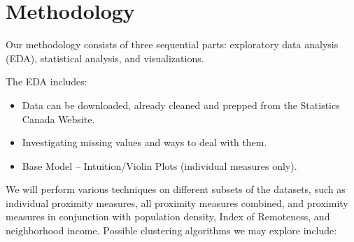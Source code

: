 \documentclass[11pt, a4paper]{article}
\newcommand{\comment}[1]{}
\begin{document}
\section*{Methodology}

\comment{
\subsection*{Data Investigation}
\subsection*{Statistical Analysis}
\subsection*{Visualization}
}

Our methodology consists of three sequential parts: exploratory data analysis (EDA), statistical analysis, and visualizations.
\par
The EDA includes:
\begin{itemize}
\item Data can be downloaded, already cleaned and prepped from the Statistics Canada Website.
\item Investigating missing values and ways to deal with them.
\item Base Model – Intuition/Violin Plots (individual measures only).
\end{itemize}

We will perform various techniques on different subsets of the datasets, such as individual proximity measures, all proximity measures combined, and proximity measures in conjunction with population density, Index of Remoteness, and neighborhood income. Possible clustering algorithms we may explore include:
\end{document}
